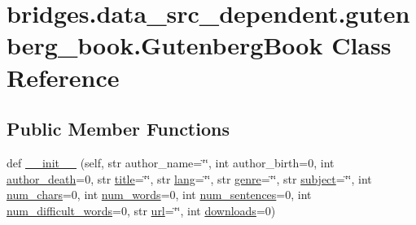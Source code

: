 \hypertarget{classbridges_1_1data__src__dependent_1_1gutenberg__book_1_1_gutenberg_book}{}\section{bridges.\+data\+\_\+src\+\_\+dependent.\+gutenberg\+\_\+book.\+Gutenberg\+Book Class Reference}
\label{classbridges_1_1data__src__dependent_1_1gutenberg__book_1_1_gutenberg_book}
\subsection*{Public Member Functions}
\begin{DoxyCompactItemize}
\item 
def \mbox{\hyperlink{classbridges_1_1data__src__dependent_1_1gutenberg__book_1_1_gutenberg_book_a68f657e8cd43cd02776eca64f68b5872}{\+\_\+\+\_\+init\+\_\+\+\_\+}} (self, str author\+\_\+name=\char`\"{}\char`\"{}, int author\+\_\+birth=0, int \mbox{\hyperlink{classbridges_1_1data__src__dependent_1_1gutenberg__book_1_1_gutenberg_book_afd78a02948accf9b270e7b9cb9e38856}{author\+\_\+death}}=0, str \mbox{\hyperlink{classbridges_1_1data__src__dependent_1_1gutenberg__book_1_1_gutenberg_book_aa26adb962fe01a2661f350fab167a144}{title}}=\char`\"{}\char`\"{}, str \mbox{\hyperlink{classbridges_1_1data__src__dependent_1_1gutenberg__book_1_1_gutenberg_book_ae1a40aed2ffea863f790adcdd4c23702}{lang}}=\char`\"{}\char`\"{}, str \mbox{\hyperlink{classbridges_1_1data__src__dependent_1_1gutenberg__book_1_1_gutenberg_book_aa1ea7fbedf83ba41079f45272419b195}{genre}}=\char`\"{}\char`\"{}, str \mbox{\hyperlink{classbridges_1_1data__src__dependent_1_1gutenberg__book_1_1_gutenberg_book_a34c82d269f7b6adfeb66fd65be837f76}{subject}}=\char`\"{}\char`\"{}, int \mbox{\hyperlink{classbridges_1_1data__src__dependent_1_1gutenberg__book_1_1_gutenberg_book_ae09997a9b793fb04f81d02404e638d2c}{num\+\_\+chars}}=0, int \mbox{\hyperlink{classbridges_1_1data__src__dependent_1_1gutenberg__book_1_1_gutenberg_book_ad1c456583f386fbd40230d07b43f467f}{num\+\_\+words}}=0, int \mbox{\hyperlink{classbridges_1_1data__src__dependent_1_1gutenberg__book_1_1_gutenberg_book_a9f206d0c36bf4e0956d78bc3bf951ab4}{num\+\_\+sentences}}=0, int \mbox{\hyperlink{classbridges_1_1data__src__dependent_1_1gutenberg__book_1_1_gutenberg_book_a5f616c4e018f44da77a861db528103fa}{num\+\_\+difficult\+\_\+words}}=0, str \mbox{\hyperlink{classbridges_1_1data__src__dependent_1_1gutenberg__book_1_1_gutenberg_book_a114cfdb3aba18898c58e696343524dd5}{url}}=\char`\"{}\char`\"{}, int \mbox{\hyperlink{classbridges_1_1data__src__dependent_1_1gutenberg__book_1_1_gutenberg_book_afb28a5f09f09aea1397d32bf075d847a}{downloads}}=0)

\end{DoxyCompactItemize}

